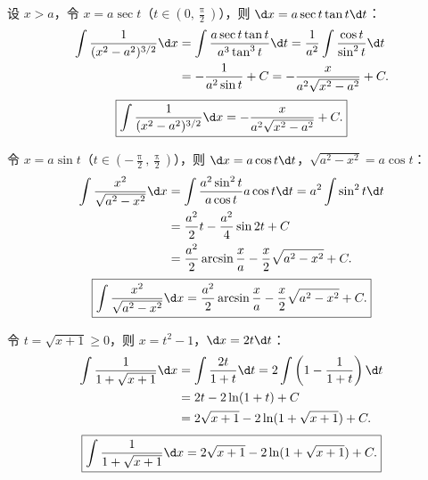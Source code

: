 \begin{solution}
    设 $x > a$，令 $x = a\sec t$（$t \in \left(0, \frac{\uppi}{2}\right)$），则 $\d x = a\sec t \tan t \d t$：
    \begin{equation}
        \begin{aligned}
            \int \frac{1}{(x^2 - a^2)^{3/2}} \d x & = \int \frac{a\sec t \tan t}{a^3 \tan^3 t} \d t = \frac{1}{a^2} \int \frac{\cos t}{\sin^2 t} \d t \\
                                                  & = -\frac{1}{a^2 \sin t} + C = -\frac{x}{a^2 \sqrt{x^2 - a^2}} + C.
        \end{aligned}
    \end{equation}
    \begin{equation}
        \boxed{\int \frac{1}{(x^2 - a^2)^{3/2}} \d x = -\frac{x}{a^2 \sqrt{x^2 - a^2}} + C.}
    \end{equation}


    令 $x = a\sin t$（$t \in \left(-\frac{\uppi}{2}, \frac{\uppi}{2}\right)$），则 $\d x = a\cos t \d t$，$\sqrt{a^2 - x^2} = a\cos t$：
    \begin{equation}
        \begin{aligned}
            \int \frac{x^2}{\sqrt{a^2 - x^2}} \d x & = \int \frac{a^2 \sin^2 t}{a\cos t} a\cos t \d t = a^2 \int \sin^2 t \d t \\
                                                   & = \frac{a^2}{2}t - \frac{a^2}{4}\sin 2t + C                               \\
                                                   & = \frac{a^2}{2}\arcsin\frac{x}{a} - \frac{x}{2}\sqrt{a^2 - x^2} + C.
        \end{aligned}
    \end{equation}
    \begin{equation}
        \boxed{\int \frac{x^2}{\sqrt{a^2 - x^2}} \d x = \frac{a^2}{2}\arcsin\frac{x}{a} - \frac{x}{2}\sqrt{a^2 - x^2} + C.}
    \end{equation}


    令 $t = \sqrt{x + 1} \geqslant 0$，则 $x = t^2 - 1$，$\d x = 2t\d t$：
    \begin{equation}
        \begin{aligned}
            \int \frac{1}{1 + \sqrt{x + 1}} \d x & = \int \frac{2t}{1 + t} \d t = 2\int \left( 1 - \frac{1}{1 + t} \right) \d t \\
                                                 & = 2t - 2\ln(1 + t) + C                                                       \\
                                                 & = 2\sqrt{x + 1} - 2\ln(1 + \sqrt{x + 1}) + C.
        \end{aligned}
    \end{equation}
    \begin{equation}
        \boxed{\int \frac{1}{1 + \sqrt{x + 1}} \d x = 2\sqrt{x + 1} - 2\ln(1 + \sqrt{x + 1}) + C.}
    \end{equation}


\end{solution}
